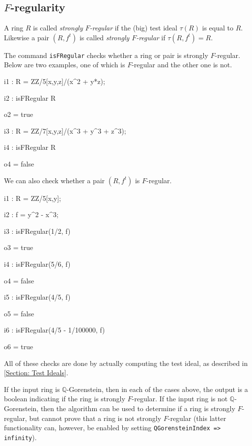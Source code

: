 \documentclass{amsart}
\begin{document}
\subsection{$F$-regularity}

\begin{definition}
A ring $R$ is called \emph{strongly $F$-regular} if the (big) test ideal $\tau(R)$ is equal to $R$.  Likewise a pair $(R, f^t)$ is called \emph{strongly $F$-regular} if $\tau(R, f^t) = R$.
\end{definition}


The command \texttt{isFRegular} checks whether a ring or pair is strongly
$F$-regular. Below are two examples, one of which is $F$-regular and the other one is not.


\medskip
{\small{}
\begin{MyVerbatim}
i1 : R = ZZ/5[x,y,z]/(x^2 + y*z);

i2 : isFRegular R

o2 = true

i3 : R = ZZ/7[x,y,z]/(x^3 + y^3 + z^3);

i4 : isFRegular R

o4 = false
\end{MyVerbatim}
}\medskip

We can also check whether a pair $(R, f^t)$ is $F$-regular.

\medskip
{\small{}
\begin{MyVerbatim}
i1 : R = ZZ/5[x,y];

i2 : f = y^2 - x^3;

i3 : isFRegular(1/2, f)

o3 = true

i4 : isFRegular(5/6, f)

o4 = false

i5 : isFRegular(4/5, f)

o5 = false

i6 : isFRegular(4/5 - 1/100000, f)

o6 = true
\end{MyVerbatim}
}\medskip

All of these checks are done by actually computing the test ideal, as described in \autoref{Section: Test Ideals}.

If the input ring is $\mathbb{Q}$-Gorenstein, then in each of the cases above, the output is a boolean indicating if the
ring is strongly $F$-regular. If the input ring is not
$\mathbb{Q}$-Gorenstein, then the algorithm can be used to determine if a
ring is strongly $F$-regular, but cannot prove that a ring is not strongly
$F$-regular (this latter functionality can, however, be enabled by setting \texttt{QGorensteinIndex => infinity}).
\end{document}
